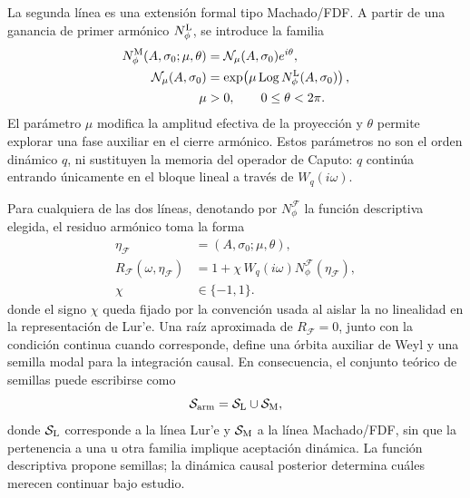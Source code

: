 \documentclass[journal]{IEEEtran}
\begin{document}
La segunda línea es una extensión formal tipo Machado/FDF. A partir de una
ganancia de primer armónico \(N_{\phi}^{\rm L}\), se introduce la familia
\begin{equation}
\label{eq:machado_df_theory}
\begin{aligned}
N_{\phi}^{\rm M}(A,\sigma_0;\mu,\theta)
&=\mathcal N_\mu(A,\sigma_0)e^{i\theta},\\
\mathcal N_\mu(A,\sigma_0)
&=\exp\!\left(\mu\operatorname{Log}
N_{\phi}^{\rm L}(A,\sigma_0)\right),\\
\mu&>0,\qquad 0\leq\theta<2\pi .
\end{aligned}
\end{equation}
El parámetro \(\mu\) modifica la amplitud efectiva de la proyección y
\(\theta\) permite explorar una fase auxiliar en el cierre armónico. Estos
parámetros no son el orden dinámico \(q\), ni sustituyen la memoria del
operador de Caputo: \(q\) continúa entrando únicamente en el bloque lineal a
través de \(W_q(i\omega)\).

Para cualquiera de las dos líneas, denotando por
\(N_{\phi}^{\mathcal F}\) la función descriptiva elegida, el residuo armónico
toma la forma
\begin{equation}
\label{eq:two_family_residual_theory}
\begin{aligned}
\eta_{\mathcal F}&=(A,\sigma_0;\mu,\theta),\\
R_{\mathcal F}(\omega,\eta_{\mathcal F})
&=1+\chi\,W_q(i\omega)
N_{\phi}^{\mathcal F}(\eta_{\mathcal F}),\\
\chi&\in\{-1,1\}.
\end{aligned}
\end{equation}
donde el signo \(\chi\) queda fijado por la convención usada al aislar la
no linealidad en la representación de Lur'e. Una raíz aproximada de
\(R_{\mathcal F}=0\), junto con la condición continua cuando corresponde,
define una órbita auxiliar de Weyl y una semilla modal para la integración
causal. En consecuencia, el conjunto teórico de semillas puede escribirse
como
\begin{equation}
\label{eq:seed_families_union_theory}
\mathcal S_{\rm arm}
=
\mathcal S_{\rm L}
\cup
\mathcal S_{\rm M},
\end{equation}
donde \(\mathcal S_{\rm L}\) corresponde a la línea Lur'e y
\(\mathcal S_{\rm M}\) a la línea Machado/FDF, sin que la pertenencia a una u
otra familia implique aceptación dinámica. La función descriptiva propone
semillas; la dinámica causal posterior determina cuáles merecen continuar
bajo estudio.
\end{document}
